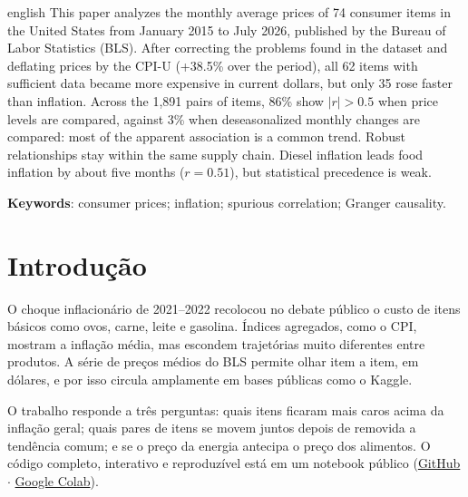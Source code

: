 \documentclass[
  article,            %
  12pt,
  oneside,
  a4paper,
  section=TITLE,      %
  english,            %
  brazil              %
]{abntex2}
\begin{document}
\renewcommand{\resumoname}{ABSTRACT}
\begin{resumoumacoluna}
  \SingleSpacing
  \begin{otherlanguage*}{english}
    This paper analyzes the monthly average prices of 74 consumer items in the United States from January 2015 to July 2026, published by the Bureau of Labor Statistics (BLS). After correcting the problems found in the dataset and deflating prices by the CPI-U (+38.5\% over the period), all 62 items with sufficient data became more expensive in current dollars, but only 35 rose faster than inflation. Across the 1,891 pairs of items, 86\% show $|r| > 0.5$ when price levels are compared, against 3\% when deseasonalized monthly changes are compared: most of the apparent association is a common trend. Robust relationships stay within the same supply chain. Diesel inflation leads food inflation by about five months ($r = 0.51$), but statistical precedence is weak.

    \vspace{0.5\onelineskip}
    \noindent
    \textbf{Keywords}: consumer prices; inflation; spurious correlation; Granger causality.
  \end{otherlanguage*}
\end{resumoumacoluna}

\textual

\section{Introdução}

O choque inflacionário de 2021--2022 recolocou no debate público o custo de itens básicos como ovos, carne, leite e gasolina. Índices agregados, como o CPI, mostram a inflação média, mas escondem trajetórias muito diferentes entre produtos. A série de preços médios do BLS permite olhar item a item, em dólares, e por isso circula amplamente em bases públicas como o Kaggle.

O trabalho responde a três perguntas: quais itens ficaram mais caros acima da inflação geral; quais pares de itens se movem juntos depois de removida a tendência comum; e se o preço da energia antecipa o preço dos alimentos. O código completo, interativo e reproduzível está em um notebook público \cite{silva2026precos} (\href{https://github.com/joaogabrielts0611-ai/Trabalho---PSP3-Joao-Gabriel-Tavares}{GitHub} $\cdot$ \href{https://colab.research.google.com/github/joaogabrielts0611-ai/Trabalho---PSP3-Joao-Gabriel-Tavares/blob/main/analise_precos_eua.ipynb}{Google Colab}).
\end{document}
